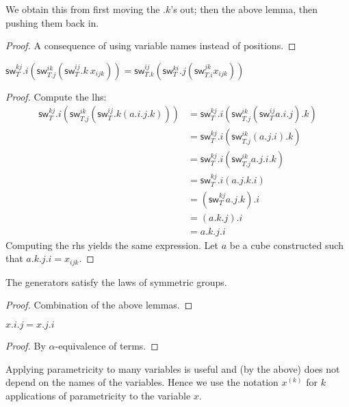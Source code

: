 \documentclass[10pt,a4paper]{article}
\newcommand\sw[2]{\mathsf{sw}^{#1}_{#2}}
\newcommand\pvar[2]{{#1}^{(#2)}}
\begin{document}
\begin{lemma}[$σ_i^2 = 1$]
  We obtain this from first moving the $.k$'s out; then the above lemma, then pushing them back in.
\end{lemma}
\begin{lemma}[$σ_i ∘ σ_j = σ_j ∘ σ_i$ if $abs(j-i) > 1$]
  
\end{lemma}
\begin{proof}
  A consequence of using variable names instead of positions.
\end{proof}
\begin{lemma}
  [$\sigma_i ∘\sigma_{i+1} ∘\sigma_i = \sigma_{i+1} ∘\sigma_i ∘\sigma_{i+1}$]
  $\sw{kj}T.i (\sw{ik}{T.j} (\sw{ij}{T}.k~ x_{ijk})) = \sw{ij}{T.k} (\sw{ki}T.j  (\sw{jk}{T.i} x_{ijk}))$
\end{lemma}
\begin{proof}
  Compute the lhs:
  \begin{align*}
     \sw{kj}T.i (\sw{ik}{T.j} (\sw{ij}{T}.k (a.i.j.k)) ) 
    &= \sw{kj}T.i (\sw{ik}{T.j} (\sw{ij}{T} a.i.j).k ) \\
    &= \sw{kj}T.i (\sw{ik}{T.j} (a.j.i).k ) \\
    &= \sw{kj}T.i (\sw{ik}{T.j} a.j.i.k ) \\
    &= \sw{kj}T.i  (a.j.k.i) \\
    &= (\sw{kj}T  a.j.k).i \\
    &= (a.k.j).i \\
    &= a.k.j.i 
  \end{align*}
  Computing the rhs yields the same expression.
  Let $a$ be a cube constructed such that $a.k.j.i = x_{ijk}$.
\end{proof}
\begin{theorem}
  The generators satisfy the laws of symmetric groups.
\end{theorem}
\begin{proof}
  Combination of the above lemmas.
\end{proof}

\begin{lemma}\label{lem:param-var}
  $x.i.j = x.j.i$
\end{lemma}
\begin{proof}
  By $α$-equivalence of terms.
\end{proof}

Applying parametricity to many variables is useful and (by the above)
does not depend on the names of the variables. Hence we use the
notation $\pvar x k$ for $k$ applications of parametricity to the
variable $x$.
\end{document}

